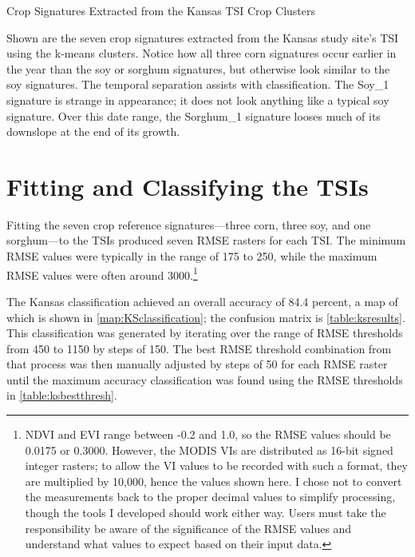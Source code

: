 \begin{ssfigure}
  \centering
  
  \caption{Crop Signatures Extracted from the Kansas TSI Crop Clusters}
  \medskip
  \small
  Shown are the seven crop signatures extracted from the Kansas study site's TSI using the k-means clusters. Notice how all three corn signatures occur earlier in the year than the soy or sorghum signatures, but otherwise look similar to the soy signatures. The temporal separation assists with classification. The Soy\_1 signature is strange in appearance; it does not look anything like a typical soy signature. Over this date range, the Sorghum\_1 signature looses much of its downslope at the end of its growth.
  \label{fig:KScropsigs}
\end{ssfigure}


\section{Fitting and Classifying the TSIs}

Fitting the seven crop reference signatures---three corn, three soy, and one sorghum---to the TSIs produced seven RMSE rasters for each TSI. The minimum RMSE values were typically in the range of 175 to 250, while the maximum RMSE values were often around 3000.\footnote{NDVI and EVI range between -0.2 and 1.0, so the RMSE values should be 0.0175 or 0.3000. However, the MODIS VIs are distributed as 16-bit signed integer rasters; to allow the VI values to be recorded with such a format, they are multiplied by 10,000, hence the values shown here. I chose not to convert the measurements back to the proper decimal values to simplify processing, though the tools I developed should work either way.  Users must take the responsibility be aware of the significance of the RMSE values and understand what values to expect based on their input data.} 

The Kansas classification achieved an overall accuracy of 84.4 percent, a map of which is shown in \autoref{map:KSclassification}; the confusion matrix is \autoref{table:ksresults}. This classification was generated by iterating over the range of RMSE thresholds from 450 to 1150 by steps of 150. The best RMSE threshold combination from that process was then manually adjusted by steps of 50 for each RMSE raster until the maximum accuracy classification was found using the RMSE thresholds in \autoref{table:ksbestthresh}.

